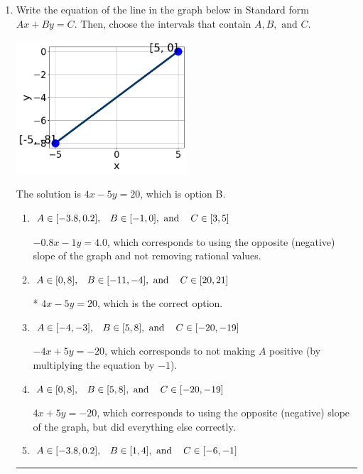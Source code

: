 \documentclass{extbook}[14pt]
\newcommand{\litem}[1]{\item #1

\rule{\textwidth}{0.4pt}}
\begin{document}
\begin{enumerate}\litem{
Write the equation of the line in the graph below in Standard form $Ax+By=C$. Then, choose the intervals that contain $A, B, \text{ and } C$.

\begin{center}
    \includegraphics[width=0.5\textwidth]{../Figures/linearGraphToStandardCopyC.png}
\end{center}


The solution is \( 4x - 5y = 20 \), which is option B.\begin{enumerate}[label=\Alph*.]
\item \( A \in [-3.8, 0.2], \hspace{3mm} B \in [-1, 0], \text{ and } \hspace{3mm} C \in [3, 5] \)

 $-0.8x - 1y = 4.0$, which corresponds to using the opposite (negative) slope of the graph and not removing rational values.
\item \( A \in [0, 8], \hspace{3mm} B \in [-11, -4], \text{ and } \hspace{3mm} C \in [20, 21] \)

* $4x - 5y = 20$, which is the correct option.
\item \( A \in [-4, -3], \hspace{3mm} B \in [5, 8], \text{ and } \hspace{3mm} C \in [-20, -19] \)

 $-4x + 5y = -20$, which corresponds to not making $A$ positive (by multiplying the equation by $-1$).
\item \( A \in [0, 8], \hspace{3mm} B \in [5, 8], \text{ and } \hspace{3mm} C \in [-20, -19] \)

 $4x + 5y = -20$, which corresponds to using the opposite (negative) slope of the graph, but did everything else correctly.
\item \( A \in [-3.8, 0.2], \hspace{3mm} B \in [1, 4], \text{ and } \hspace{3mm} C \in [-6, -1] \)


\end{enumerate}}
\end{enumerate}
\end{document}
